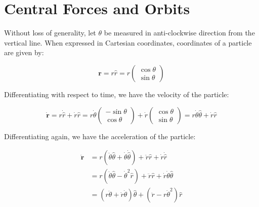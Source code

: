 \documentclass[12pt]{article}
\begin{document}



\pagebreak
\section*{Central Forces and Orbits}



Without loss of generality, let $\theta$ be measured in anti-clockwise direction from the vertical line. When expressed in Cartesian coordinates, coordinates of a particle are given by:

\begin{equation}
    \mathbf{r} = r \hat{r} = r \begin{pmatrix}
        \cos{\theta} \\
        \sin{\theta} 
    \end{pmatrix}
\end{equation}

Differentiating with respect to time, we have the velocity of the particle:

\begin{equation}
    \dot{\mathbf{r}} = r \dot{\hat{r}} + \dot{r} \hat{r} 
    =
    r \dot{\theta} \begin{pmatrix}
        -\sin{\theta} \\
        \cos{\theta} 
    \end{pmatrix}
    +
    \dot{r} \begin{pmatrix}
        \cos{\theta} \\
        \sin{\theta} 
    \end{pmatrix}
    =
    r \dot{\theta} \hat{\theta} + \dot{r} \hat{r}
\end{equation}

Differentiating again, we have the acceleration of the particle:

\begin{equation}
\begin{split}
    \ddot{\mathbf{r}} &= r(\ddot{\theta} \hat{\theta} + \dot{\theta} \dot{\hat{\theta}}) + \ddot{r} \hat{r} + \dot{r} \dot{\hat{r}} \\
    &= r(\ddot{\theta} \hat{\theta} - \dot{\theta}^2 \hat{r}) + \ddot{r} \hat{r} + \dot{r} \dot{\theta} \hat{\theta} \\
    &= (r \ddot{\theta} + \dot{r} \dot{\theta}) \hat{\theta} + (\ddot{r} - r \dot{\theta}^{2}) \hat{r}
\end{split}
\end{equation}
\end{document}
